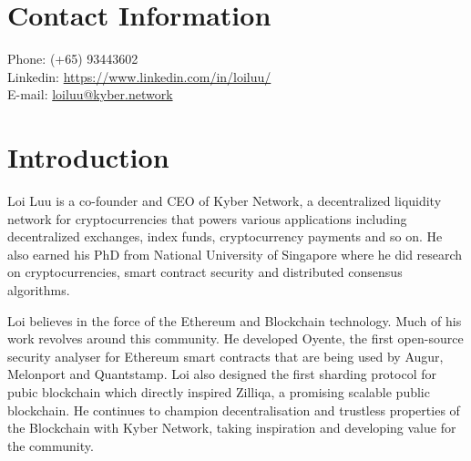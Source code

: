 \documentclass[margin,line]{res}
\begin{document}

\begin{resume}
\section{\sc Contact Information}
\vspace{.05in}
{Phone: } (+65) 93443602 \\            
{ Linkedin:} \href{https://www.linkedin.com/in/loiluu/}{https://www.linkedin.com/in/loiluu/}\\         
{ E-mail:}  \href{mailto:loiluu@kyber.network}{\textsf{loiluu@kyber.network}} \\       


\section{\sc Introduction}
Loi Luu is a co-founder and CEO of Kyber Network, a decentralized liquidity network for cryptocurrencies that powers various applications including decentralized exchanges, index funds, cryptocurrency payments and so on. He also earned his PhD from National University of Singapore where he did research on cryptocurrencies, smart contract security and distributed consensus algorithms. 

Loi believes in the force of the Ethereum and Blockchain technology. Much of his work revolves around this community. He developed Oyente, the first open-source security analyser for Ethereum smart contracts that are being used by Augur, Melonport and Quantstamp. Loi also designed the first sharding protocol for pubic blockchain which directly inspired Zilliqa, a promising scalable public blockchain. He continues to champion decentralisation and trustless properties of the Blockchain with Kyber Network, taking inspiration and developing value for the community.


\end{resume}
\end{document}

